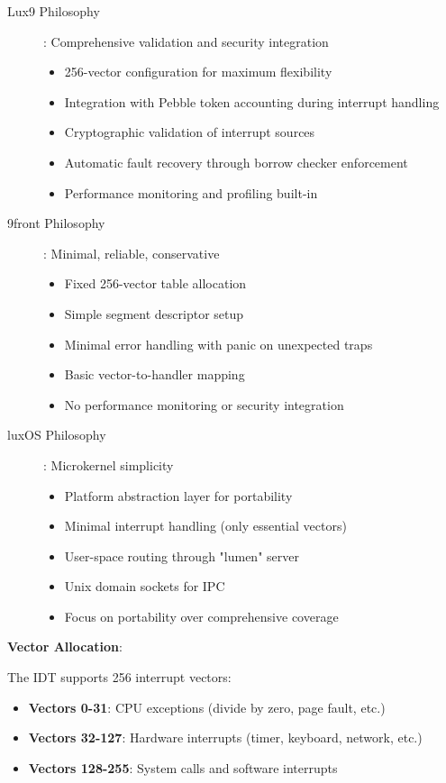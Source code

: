 \documentclass[11pt,letterpaper]{article}
\begin{document}
\begin{description}
\item[Lux9 Philosophy]: Comprehensive validation and security integration
  \begin{itemize}
  \item 256-vector configuration for maximum flexibility
  \item Integration with Pebble token accounting during interrupt handling
  \item Cryptographic validation of interrupt sources
  \item Automatic fault recovery through borrow checker enforcement
  \item Performance monitoring and profiling built-in
  \end{itemize}

\item[9front Philosophy]: Minimal, reliable, conservative
  \begin{itemize}
  \item Fixed 256-vector table allocation
  \item Simple segment descriptor setup
  \item Minimal error handling with panic on unexpected traps
  \item Basic vector-to-handler mapping
  \item No performance monitoring or security integration
  \end{itemize}

\item[luxOS Philosophy]: Microkernel simplicity
  \begin{itemize}
  \item Platform abstraction layer for portability
  \item Minimal interrupt handling (only essential vectors)
  \item User-space routing through "lumen" server
  \item Unix domain sockets for IPC
  \item Focus on portability over comprehensive coverage
  \end{itemize}
\end{description}

\textbf{Vector Allocation}:

The IDT supports 256 interrupt vectors:
\begin{itemize}
\item \textbf{Vectors 0-31}: CPU exceptions (divide by zero, page fault, etc.)
\item \textbf{Vectors 32-127}: Hardware interrupts (timer, keyboard, network, etc.)
\item \textbf{Vectors 128-255}: System calls and software interrupts
\end{itemize}
\end{document}

